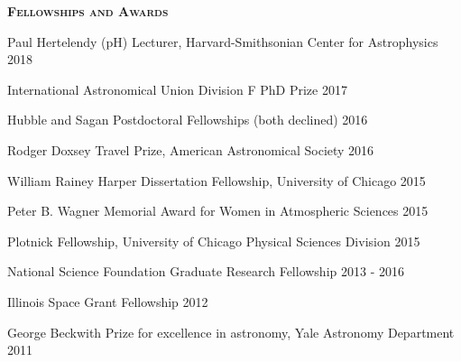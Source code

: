\documentclass[12pt,letterpaper]{article}
\begin{document}
\vspace{5mm}
\textbf{\textsc{Fellowships and Awards}}
\begin{compactitem}[]
\item Paul Hertelendy (pH) Lecturer, Harvard-Smithsonian Center for Astrophysics \hfill 2018 
\item International Astronomical Union Division F PhD Prize \hfill 2017
\item Hubble and Sagan Postdoctoral Fellowships (both declined) \hfill 2016
\item Rodger Doxsey Travel Prize, American Astronomical Society \hfill 2016
\item William Rainey Harper Dissertation Fellowship, University of Chicago \hfill 2015
\item Peter B. Wagner Memorial Award for Women in Atmospheric Sciences \hfill 2015
\item Plotnick Fellowship, University of Chicago Physical Sciences Division \hfill 2015
\item National Science Foundation Graduate Research Fellowship \hfill 2013 - 2016
\item Illinois Space Grant Fellowship \hfill 2012
\item George Beckwith Prize for excellence in astronomy, Yale Astronomy Department \hfill2011
\end{compactitem}
\vspace{7mm}
\end{document}
